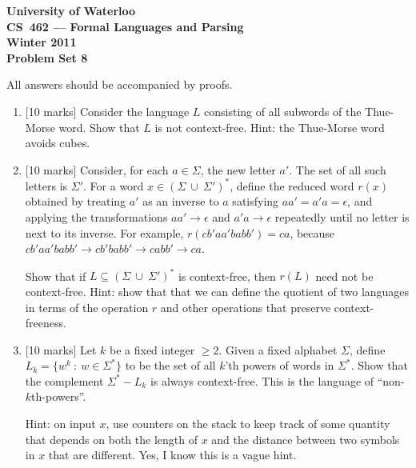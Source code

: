 \documentclass[12pt]{article}
\begin{document}
\begin{center}
\large\bf University of Waterloo\\
CS~462 --- Formal Languages and Parsing\\
Winter 2011\\
Problem Set 8\\
\end{center}

\bigskip


\smallskip


\bigskip\bigskip

All answers should be accompanied by proofs.

\begin{enumerate}

\item{} [10 marks]
Consider the language $L$ consisting of all subwords of the Thue-Morse
word.  Show that $L$ is not context-free.  Hint:  the Thue-Morse word
avoids cubes.

\item{} [10 marks] 
Consider, for each $a \in \Sigma$, the new letter $a'$.
The set of all such letters is $\Sigma'$.  For a word $x \in (\Sigma \ \cup \
\Sigma')^*$, define the reduced word $r(x)$ obtained by treating
$a'$ as an inverse to $a$ satisfying $aa' = a'a = \epsilon$, and applying
the transformations $aa' \rightarrow \epsilon$ and
$a'a \rightarrow \epsilon$ repeatedly until no letter is next to its inverse.
For example, $r(c b' a a' b a b b') = c a$, because
$cb'aa'babb' \rightarrow cb'babb' \rightarrow cabb' \rightarrow ca$.

\medskip

Show that if $L \subseteq (\Sigma \ \cup \ \Sigma')^*$ is context-free, then
$r(L)$ need not be context-free.  Hint:  show that
that we can define the quotient of two languages in terms of the operation
$r$ and other operations that preserve context-freeness.

\item{} [10 marks]
Let $k$ be a fixed integer $\geq 2$.  
Given a fixed alphabet $\Sigma$,
define $L_k = \lbrace w^k \ : \ w \in \Sigma^* \rbrace$ to be the set
of all $k$'th powers of words in $\Sigma^*$.  Show that the
complement $\Sigma^* - L_k$ is always context-free.  This is the
language of ``non-$k$th-powers''.

\medskip

Hint:  on input $x$, use counters on the stack to keep track 
of some quantity that depends on both the length of $x$ and the distance
between two symbols in $x$ that are different.  Yes, I know this is a vague
hint.

\end{enumerate}
\end{document}
